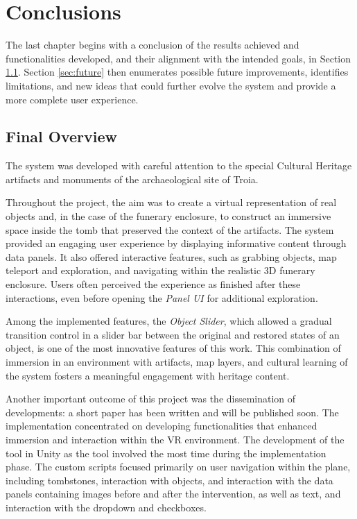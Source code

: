 
%

\chapter{Conclusions}
\label{cha:conclusions}
The last chapter begins with a conclusion of the results achieved and functionalities developed, and their alignment with the intended goals, in Section \ref{sec:final_overview}.
Section \ref{sec:future} then enumerates possible future improvements, identifies limitations, and new ideas that could further evolve the system and provide a more complete user experience.
\section{Final Overview}
\label{sec:final_overview}
The system was developed with careful attention to the special Cultural Heritage artifacts and monuments of the archaeological site of Troia. 

Throughout the project, the aim was to create a virtual representation of real objects and, in the case of the funerary enclosure, to construct an immersive space inside the tomb that preserved the context of the artifacts.
The system provided an engaging user experience by displaying informative content through data panels. It also offered interactive features, such as grabbing objects, map teleport and exploration, and navigating within the realistic \gls{3D} funerary enclosure. Users often perceived the experience as finished after these interactions, even before opening the \emph{Panel \gls{UI}} for additional exploration. 

Among the implemented features, the \emph{Object Slider}, which allowed a gradual transition control in a slider bar between the original and restored states of an object, is one of the most innovative features of this work. This combination of immersion in an environment with artifacts, map layers, and cultural learning of the system fosters a meaningful engagement with heritage content.

Another important outcome of this project was the dissemination of developments: a short paper has been written and will be published soon.
The implementation concentrated on developing functionalities that enhanced immersion and interaction within the \gls{VR} environment. 
The development of the tool in Unity as the tool involved the most time during the implementation phase. The custom scripts focused primarily on user navigation within the plane, including tombstones, interaction with objects, and interaction with the data panels containing images before and after the intervention, as well as text, and interaction with the dropdown and checkboxes. 

